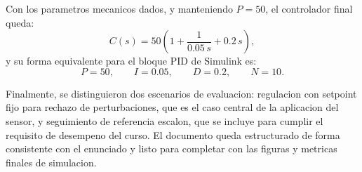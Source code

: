 \documentclass[11pt]{article}
\begin{document}
Con los parametros mecanicos dados, y manteniendo $P=50$, el controlador final queda:
\[
C(s)=50\left(1+\frac{1}{0.05\,s}+0.2\,s\right),
\]
y su forma equivalente para el bloque PID de Simulink es:
\[
P=50,\qquad I=0.05,\qquad D=0.2,\qquad N=10.
\]

Finalmente, se distinguieron dos escenarios de evaluacion: regulacion con setpoint fijo para rechazo de perturbaciones, que es el caso central de la aplicacion del sensor, y seguimiento de referencia escalon, que se incluye para cumplir el requisito de desempeno del curso. El documento queda estructurado de forma consistente con el enunciado y listo para completar con las figuras y metricas finales de simulacion.
\end{document}
